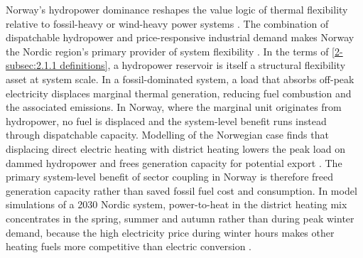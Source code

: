 Norway's hydropower dominance reshapes the value logic of thermal flexibility relative to fossil-heavy or wind-heavy power systems \cite{NVE_langsiktig_2023}. The combination of dispatchable hydropower and price-responsive industrial demand makes Norway the Nordic region's primary provider of system flexibility \cite{skytte_flexible_2019}. In the terms of \autoref{2-subsec:2.1.1 definitions}, a hydropower reservoir is itself a structural flexibility asset at system scale. In a fossil-dominated system, a load that absorbs off-peak electricity displaces marginal thermal generation, reducing fuel combustion and the associated emissions. In Norway, where the marginal unit originates from hydropower, no fuel is displaced and the system-level benefit runs instead through dispatchable capacity. Modelling of the Norwegian case finds that displacing direct electric heating with district heating lowers the peak load on dammed hydropower and frees generation capacity for potential export \cite{askeland_balancing_2019}. The primary system-level benefit of sector coupling in Norway is therefore freed generation capacity rather than saved fossil fuel cost and consumption. In model simulations of a 2030 Nordic system, power-to-heat in the district heating mix concentrates in the spring, summer and autumn rather than during peak winter demand, because the high electricity price during winter hours makes other heating fuels more competitive than electric conversion \cite{kirkerud_power--heat_2017}. 

